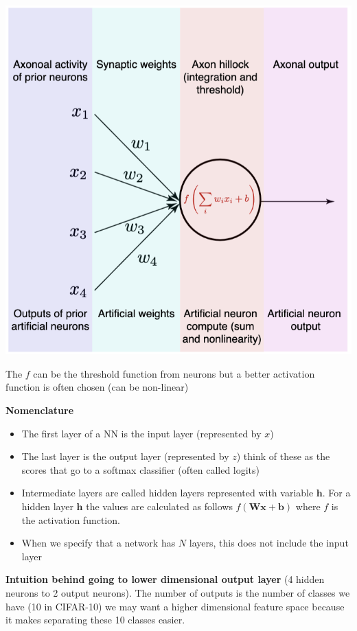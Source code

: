 \documentclass[twocolumn, letter, 10pt, landscape]{article}
\newcommand{\mb}{\mathbf}
\newcommand{\tb}{\textbf}
\newcommand{\bit}{\vspace{-0.1in}\begin{itemize}\setlength\itemsep{-0.05in}}
\newcommand{\eit}{\end{itemize}\vspace{-0.1in}}
\begin{document}
\begin{minipage}{2.5in}
\includegraphics[scale=0.5]{lec5_graph2.png}
\end{minipage}
\begin{minipage}{2.7in}
The $f$ can be the threshold function from neurons but a better activation function is often chosen (can be non-linear)

\tb{Nomenclature}
\bit{}
\item The first layer of a NN is the input layer (represented by $x$)
\item The last layer is the output layer (represented by $z$) think of these as the scores that go to a softmax classifier (often called logits)
\item Intermediate layers are called hidden layers represented with variable $\mb{h}$. For a hidden layer $\mb{h}$ the values are calculated as follows $f(\mb{Wx}+\mb{b})$ where $f$ is the activation function.
\item When we specify that a network has $N$ layers, this does not include the input layer
\eit{}
\end{minipage}

\tb{Intuition behind going to lower dimensional output layer} (4 hidden neurons to 2 output neurons). The number of outputs is the number of classes we have (10 in CIFAR-10) we may want a higher dimensional feature space because it makes separating these 10 classes easier.
\end{document}
